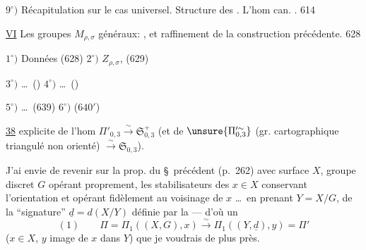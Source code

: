 
\(9^{\circ})\) Récapitulation sur le cas universel.
Structure des . L'hom can.
.
\hfill {} 614

\textcircled{\uline{VI}} Les groupes \(M_{\rho,\sigma}\) généraux:
, et raffinement de la construction précédente. \hfill 628

\(1^{\circ})\) Données (628) \quad
\(2^{\circ})\) \(Z_{\rho,\sigma}\), \unsure{\(\sigma_{\rho,\sigma}\)|\(\delta_{\rho,\sigma}\)} (629)

\(3^{\circ})\) \ldots\ () \quad
\(4^{\circ})\) \ldots\ ()

\(5^{\circ})\) \ldots\ (639) \quad
\(6^{\circ})\)  (\(640'\))




\uline{38}\quad {} explicite de l'hom
$\Pi'_{0,3}\xrightarrow{\sim}\mathfrak S_{0,3}^{+}$
(et de $\unsure{\Pi_{0,3}^{\prime\sim}}$
(gr. cartographique triangulé non orienté)
$\xrightarrow{\sim}\mathfrak S_{0,3}$).

J'ai envie de revenir sur la prop. du \S\ précédent
(p.\ 262) avec surface  $X$, groupe discret $G$
opérant proprement, les stabilisateurs  des $x\in X$
 conservant l'orientation et opérant fidèlement
au voisinage de $x$ \ldots\ en prenant $Y=X/G$,  de la
``signature'' $\underline d=d(X/Y)$ définie par la 
--- d'où un \uline{}
\[
(1)\qquad
\Pi=\Pi_1((X,G),x)\xrightarrow{\sim}\Pi_1((Y,\underline d),y)=\Pi'
\]
($x\in X$, $y$ image de $x$ dans $Y$)
que je voudrais  de plus près.

